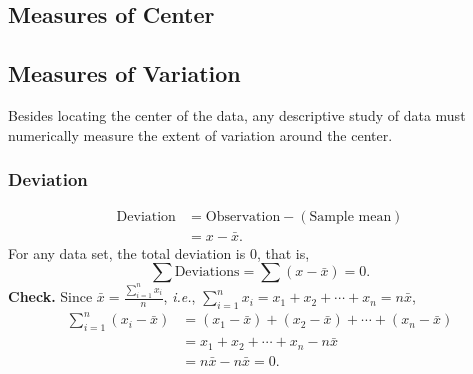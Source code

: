 \documentclass[12pt,a4paper]{article}
\newcommand{\ie}{\textit{i.e.}}
\newcommand{\mean}[1]{\bar{#1}}
\begin{document}
\subsection{Measures of Center}
%
\subsection{Measures of Variation}
Besides locating the center of the data, any descriptive study of data must numerically measure the extent of variation around the center. 
\subsubsection{Deviation}
\begin{align*}
	\text{Deviation} &= \text{Observation} - (\text{Sample mean}) \\
	&= x - \mean{x}.
\end{align*}
For any data set, the total deviation is 0, that is, \[
\sum\text{Deviations} = \sum(x-\mean{x})=0.
\] \textbf{Check.} Since $\mean{x}=\frac{\sum_{i=1}^nx_i}{n}$, \ie, $\sum_{i=1}^nx_i=x_1+x_2+\cdots+x_n=n\mean{x}$, \begin{align*}
	\sum_{i=1}^n(x_i-\mean{x}) &= (x_1-\mean{x}) + (x_2-\mean{x}) + \cdots + (x_n-\mean{x}) \\
	&= x_1+x_2+\cdots+x_n-n\mean{x} \\
	&= n\mean{x} - n\mean{x} = 0.
\end{align*}
\end{document}
